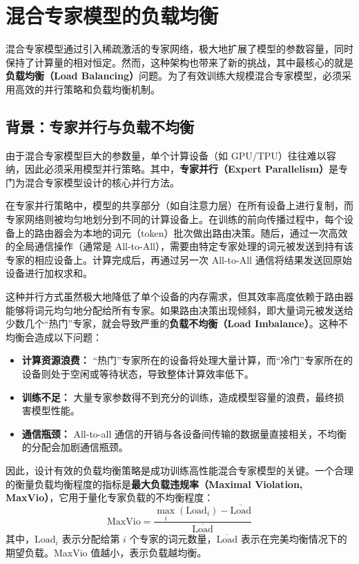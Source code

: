 \section{混合专家模型的负载均衡}

混合专家模型通过引入稀疏激活的专家网络，极大地扩展了模型的参数容量，同时保持了计算量的相对恒定。然而，这种架构也带来了新的挑战，其中最核心的就是\textbf{负载均衡（Load Balancing）}问题。为了有效训练大规模混合专家模型，必须采用高效的并行策略和负载均衡机制。

\subsection{背景：专家并行与负载不均衡}
\label{sec:ep_and_lb}
由于混合专家模型巨大的参数量，单个计算设备（如 GPU/TPU）往往难以容纳，因此必须采用模型并行策略。其中，\textbf{专家并行（Expert Parallelism）}是专门为混合专家模型设计的核心并行方法\cite{Lepikhin2020GShardSG,Fedus2021SwitchTS}。

在专家并行策略中，模型的共享部分（如自注意力层）在所有设备上进行复制，而专家网络则被均匀地划分到不同的计算设备上。在训练的前向传播过程中，每个设备上的路由器会为本地的词元（token）批次做出路由决策。随后，通过一次高效的全局通信操作（通常是 All-to-All），需要由特定专家处理的词元被发送到持有该专家的相应设备上。计算完成后，再通过另一次 All-to-All 通信将结果发送回原始设备进行加权求和。

这种并行方式虽然极大地降低了单个设备的内存需求，但其效率高度依赖于路由器能够将词元均匀地分配给所有专家。如果路由决策出现倾斜，即大量词元被发送给少数几个“热门”专家，就会导致严重的\textbf{负载不均衡（Load Imbalance）}。这种不均衡会造成以下问题：
\begin{itemize}
    \item \textbf{计算资源浪费：} “热门”专家所在的设备将处理大量计算，而“冷门”专家所在的设备则处于空闲或等待状态，导致整体计算效率低下。
    \item \textbf{训练不足：} 大量专家参数得不到充分的训练，造成模型容量的浪费，最终损害模型性能。
    \item \textbf{通信瓶颈：} All-to-all 通信的开销与各设备间传输的数据量直接相关，不均衡的分配会加剧通信瓶颈。
\end{itemize}
因此，设计有效的负载均衡策略是成功训练高性能混合专家模型的关键。一个合理的衡量负载均衡程度的指标是\textbf{最大负载违规率（Maximal Violation, MaxVio）}\cite{Wang2024AuxiliaryLossFreeLB}，它用于量化专家负载的不均衡程度：
\begin{equation}
    \text{MaxVio} = \frac{\max_{i}(\text{Load}_i) - \overline{\text{Load}}}{\overline{\text{Load}}}
\end{equation}
其中，$\text{Load}_i$ 表示分配给第 $i$ 个专家的词元数量，$\overline{\text{Load}}$ 表示在完美均衡情况下的期望负载。MaxVio 值越小，表示负载越均衡。

